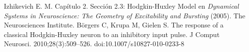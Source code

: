 \begin{thebibliography}{50}
{} Izhikevich E. M. Capítulo 2. Sección 2.3: Hodgkin-Huxley Model en {\sl Dynamical Systems in Neuroscience: The Geometry of Excitability and Bursting} (2005).  The Neurosciences Institute.
 Börgers C, Krupa M, Gielen S. The response of a classical Hodgkin-Huxley neuron to an inhibitory input pulse. J Comput Neurosci. 2010;28(3):509–526. doi:10.1007/s10827-010-0233-8
\end{thebibliography}


